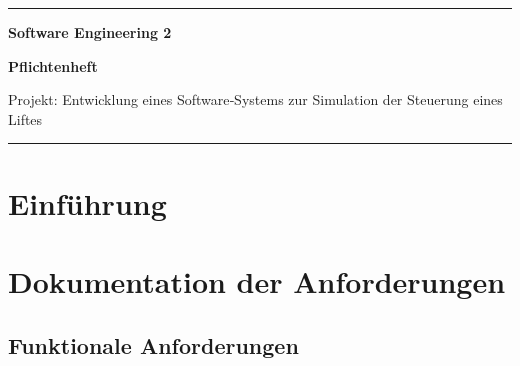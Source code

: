 


\begin{titlepage}
	\vspace*{\fill}

	\rule{\textwidth}{0.25pt}

	\vspace*{1cm}

	\begin{singlespace}
		\begin{center}	\Large	\bfseries
			Software Engineering 2
		\end{center}
	\end{singlespace}

	\vspace{1em}

	\begin{singlespace}
		\begin{center}	\Large \bfseries
		Pflichtenheft
		
		\vspace{2em}	\large	
		
		Projekt: \newline
		Entwicklung eines Software‐Systems \newline
		zur Simulation der Steuerung eines Liftes
		
		\end{center}
	\end{singlespace}

	\vspace*{5cm}

	\rule{\textwidth}{0.25pt}

	\vspace*{\fill}
\end{titlepage}


\tableofcontents


\chapter{Einführung}

\chapter{Dokumentation der Anforderungen}

\section{Funktionale Anforderungen}

